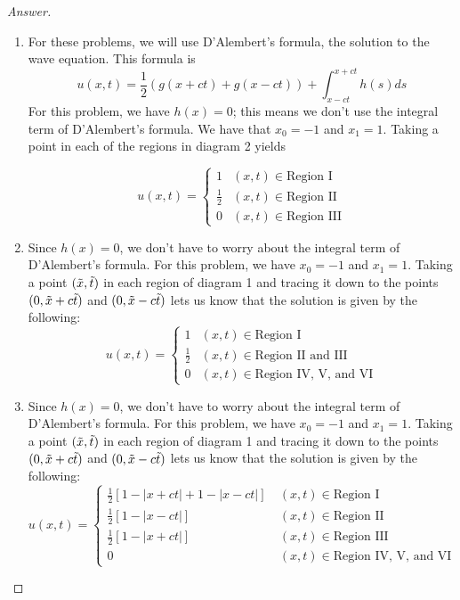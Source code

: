 \documentclass{article}
\theoremstyle{definition}
\renewcommand\qedsymbol{$\blacksquare$}
\newenvironment{ans}{\begin{proof}[Answer]\renewcommand{\qedsymbol}{}}{\end{proof}}
\begin{document}
\begin{ans}
\begin{enumerate}[(1), start = 7, resume*=answers]
    \item For these problems, we will use D'Alembert's formula, the solution to the wave equation. This formula is
    \[u(x,t) = \frac{1}{2}(g(x+ct) + g(x-ct)) + \int_{x-ct}^{x+ct}h(s)ds\]
    For this problem, we have $h(x)=0$; this means we don't use the integral term of D'Alembert's formula. We have that $x_0=-1$ and $x_1=1$. Taking a point in each of the regions in diagram 2 yields
    
      \[\boxed{u(x,t) = \begin{cases}
        1 & (x,t)\in \text{Region I}\\
        \frac{1}{2} & (x,t)\in \text{Region II}\\
        0 & (x,t)\in \text{Region III}
    \end{cases}}\]


    \item Since $h(x) = 0$, we don't have to worry about the integral term of D'Alembert's formula. For this problem, we have $x_0 = -1$ and $x_1 = 1$. Taking a point $(\Tilde{x}, \Tilde{t})$ in each region of diagram 1 and tracing it down to the points $(0, \Tilde{x} + c\Tilde{t})$ and $(0, \Tilde{x} - c\Tilde{t})$ lets us know that the solution is given by the following:
    \[\boxed{u(x,t) = \begin{cases}
        1 & (x,t)\in \text{Region I}\\
        \frac{1}{2} & (x,t)\in \text{Region II and III}\\
        0 & (x,t)\in \text{Region IV, V, and VI}
    \end{cases}}\]

    \item 
        Since $h(x) = 0$, we don't have to worry about the integral term of D'Alembert's formula. For this problem, we have $x_0 = -1$ and $x_1 = 1$. Taking a point $(\Tilde{x}, \Tilde{t})$ in each region of diagram 1 and tracing it down to the points $(0, \Tilde{x} + c\Tilde{t})$ and $(0, \Tilde{x} - c\Tilde{t})$ lets us know that the solution is given by the following:
        \[\boxed{u(x,t) = \begin{cases}
        \frac{1}{2} \left[ 1-|x+ct| + 1-|x-ct| \right]\ & (x,t)\in\text{Region I}\\
        \frac{1}{2} \left[ 1-|x-ct| \right] & (x,t)\in\text{Region II}\\
        \frac{1}{2} \left[ 1-|x+ct| \right] & (x,t) \in \text{Region III}\\
        0 & (x,t) \in \text{Region IV, V, and VI}
    \end{cases}}\]


\end{enumerate}
\end{ans}
\end{document}
